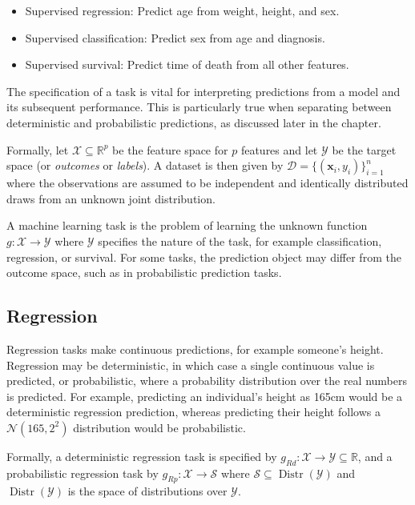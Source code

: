 \documentclass[
  letterpaper,
  krantz2]{style/krantz}
\providecommand{\tightlist}{%
  \setlength{\itemsep}{0pt}\setlength{\parskip}{0pt}}
\begin{document}
\begin{itemize}
\tightlist
\item
  Supervised regression: Predict age from weight,
  height, and sex.
\item
  Supervised classification: Predict sex from age
  and diagnosis.
\item
  Supervised survival: Predict time of death from all other features.
\end{itemize}

The specification of a task is vital for interpreting predictions from a
model and its subsequent performance. This is particularly true when
separating between deterministic and probabilistic predictions, as
discussed later in the chapter.

Formally, let \(\mathcal{X}\subseteq \mathbb{R}^p\) be the feature space
for \(p\) features and let \(\mathcal{Y}\) be the target space (or
\emph{outcomes} or \emph{labels}). A dataset is then given by
\(\mathcal{D}= \{(\mathbf{x}_i, y_i)\}_{i=1}^n\) where the observations
are assumed to be independent and identically distributed draws from an
unknown joint distribution.

A machine learning task is the problem of learning the unknown function
\(g : \mathcal{X}\rightarrow \mathcal{Y}\) where \(\mathcal{Y}\)
specifies the nature of the task, for example classification,
regression, or survival. For some tasks, the prediction object may
differ from the outcome space, such as in probabilistic prediction
tasks.

\subsection{Regression}\label{sec-ml-tasks-regr}

Regression tasks make continuous predictions, for example someone's
height. Regression may be
deterministic, in which case a single
continuous value is predicted, or
probabilistic, where a probability
distribution over the real numbers is predicted. For example, predicting
an individual's height as 165cm would be a deterministic regression
prediction, whereas predicting their height follows a
\(\mathcal{N}(165, 2^2)\) distribution would be probabilistic.

Formally, a deterministic regression task is specified by
\(g_{Rd} : \mathcal{X}\rightarrow \mathcal{Y}\subseteq \mathbb{R}\), and
a probabilistic regression task by
\(g_{Rp} : \mathcal{X}\rightarrow \mathcal{S}\) where
\(\mathcal{S}\subseteq \operatorname{Distr}(\mathcal{Y})\) and
\(\operatorname{Distr}(\mathcal{Y})\) is the space of distributions over
\(\mathcal{Y}\).
\end{document}
